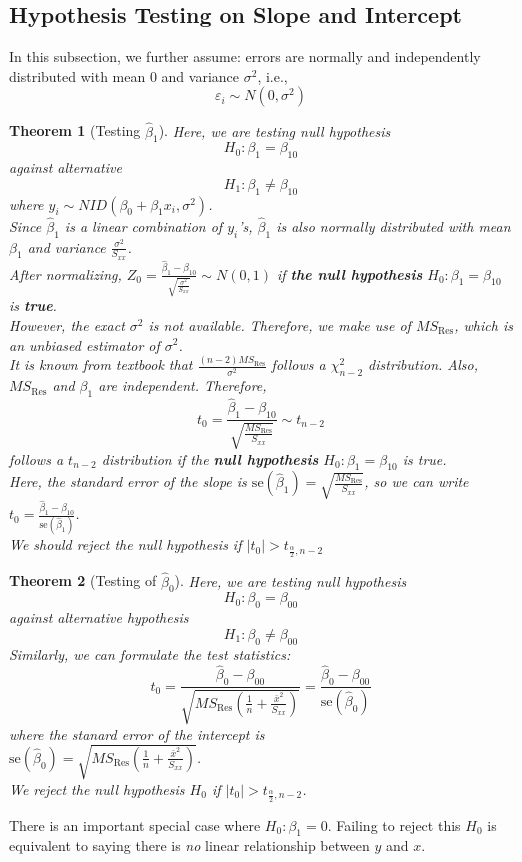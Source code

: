\documentclass[11pt]{article}
\newcommand{\se}{\mathrm{se}}
\newtheorem{theorem}{Theorem}[section]
\theoremstyle{definition}
\begin{document}
\subsection{Hypothesis Testing on Slope and Intercept}
In this subsection, we further assume: errors are normally and independently distributed with mean $0$ and variance $\sigma^2$, i.e.,
\[
\varepsilon_i\sim N(0,\sigma^2)
\]
\begin{theorem}[Testing {$\hat{\beta}_1$}]
\normalfont Here, we are testing null hypothesis
\[
H_0:\beta_1= \beta_{10}
\]
against alternative
\[
H_1: \beta_1\neq \beta_{10}
\]
where $y_i\sim NID(\beta_0 + \beta_1x_i, \sigma^2)$.\\
Since $\hat{\beta}_1$ is a linear combination of $y_i$'s, $\hat{\beta}_1$ is also normally distributed with mean $\beta_1$ and variance $\frac{\sigma^2}{S_{xx}}$.\\ After normalizing, $Z_0 = \frac{\hat{\beta}_1-\beta_{10}}{\sqrt{\frac{\sigma^2}{S_{xx}}}}\sim N(0,1)$ if \textbf{the null hypothesis} $H_0:\beta_1 = \beta_{10}$ is \textbf{true}.\\

However, the exact $\sigma^2$ is not available. Therefore, we make use of $MS_\text{Res}$, which is an unbiased estimator of $\sigma^2$.\\
It is known \textit{from textbook} that $\frac{(n-2)MS_\text{Res}}{\sigma^2}$ follows a $\chi_{n-2}^2$ distribution. Also, $MS_\text{Res}$ and $\beta_1$ are independent. Therefore,
\[
t_0=\frac{\hat{\beta}_1-\beta_{10}}{\sqrt{\frac{MS_\text{Res}}{S_{xx}}}}\sim t_{n-2}
\]
follows a $t_{n-2}$ distribution if the \textbf{null hypothesis} $H_0: \beta_1 = \beta_{10}$ is true.\\
Here, the standard error of the slope is $\se(\hat{\beta}_1)=\sqrt{\frac{MS_\text{Res}}{S_{xx}}}$, so we can write $t_0 = \frac{\hat{\beta}_1-\beta_{10}}{\se(\hat{\beta}_1)}$.\\
We should reject the null hypothesis if $|t_0|> t_{\frac{\alpha}{2}, n-2}$
\end{theorem}
\begin{theorem}[Testing of {$\hat{\beta}_0$}]
\normalfont Here, we are testing null hypothesis 
\[
H_0: \beta_0 = \beta_{00}
\]
against alternative hypothesis
\[
H_1: \beta_0 \neq \beta_{00}
\]
Similarly, we can formulate the test statistics:
\[
t_0 = \frac{\hat{\beta}_0-\beta_{00}}{\sqrt{MS_\text{Res}(\frac{1}{n}+\frac{\bar{x}^2}{S_{xx}})}} = \frac{\hat{\beta}_0-\beta_{00}}{\se(\hat{\beta}_0)}
\]
where the stanard error of the intercept is\\ $\se(\hat{\beta}_0) = \sqrt{MS_\text{Res}(\frac{1}{n}+\frac{\bar{x}^2}{S_{xx}})}$.\\
We reject the null hypothesis $H_0$ if $|t_0|> t_{\frac{\alpha}{2}, n-2}$.
\end{theorem}
There is an important special case where $H_0: \beta_1 = 0$. Failing to reject this $H_0$ is equivalent to saying there is \textit{no} linear relationship between $y$ and $x$.
\end{document}
